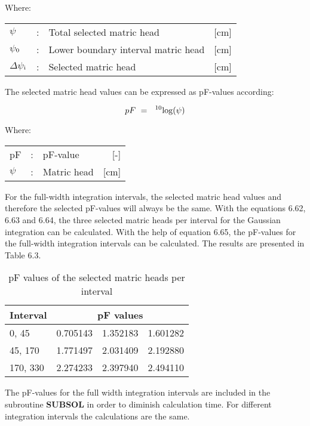 Where:\\[5pt]
\begin{tabularx}{\textwidth}{llXr}
$\psi$ &:& Total selected matric head  & [cm]\\
$\psi$$_{{\rm 0}}$ &:& Lower boundary interval matric head  & [cm]\\
$\Delta$$\psi$$_{{\rm i}}$ &:& Selected matric head  & [cm]\\
\end{tabularx}

The selected matric head values can be expressed as pF-values according:

\begin{equation}
pF ~=~\ ^{10} {\rm log} (\psi )
\end{equation}

Where:\\[5pt]
\begin{tabularx}{\textwidth}{llXr}
pF &:& pF-value  & [-]\\
$\psi$ &:& Matric head  & [cm]\\
\end{tabularx}

For the full-width integration intervals, the selected matric head values and therefore the
selected pF-values will always be the same. With the equations 6.62,  6.63 and 6.64, the
three selected matric heads per interval for the Gaussian integration can be calculated.
With the help of equation 6.65, the pF-values for the full-width integration intervals can
be calculated. The results are presented in Table 6.3.

\begin{table}
\centering
\caption{pF values of the selected matric heads per interval}
\label{tab:Table6.3}
\begin{tabular}{l|rrr}
\hline
Interval & \multicolumn{3}{c}{pF values}\\
\hline
0, 45    & 0.705143  &  1.352183 &    1.601282    \\
45, 170  &  1.771497 &  2.031409 &    2.192880    \\
170, 330 &  2.274233 &  2.397940 &    2.494110    \\
\hline
\end{tabular}
\end{table}

The pF-values for the full width integration intervals are included in the subroutine
{\bf SUBSOL} in order to diminish calculation time. For different integration intervals the
calculations are the same. 

